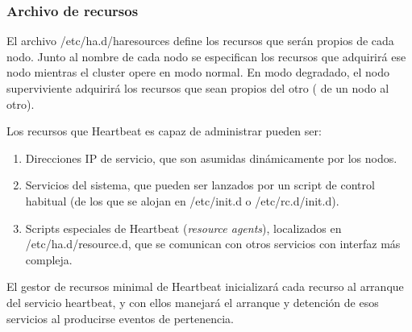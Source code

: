 




\subsubsection{Archivo de recursos}
El archivo /etc/ha.d/haresources define los recursos que serán propios de cada nodo. Junto al nombre de cada nodo se especifican los recursos que adquirirá ese nodo mientras el cluster opere en modo normal. En modo degradado, el nodo superviviente adquirirá los recursos que sean propios del otro ( de un nodo al otro). 

Los recursos que Heartbeat es capaz de administrar pueden ser:


\begin{enumerate}
	\item Direcciones IP de servicio, que son asumidas dinámicamente por los nodos.
	\item Servicios del sistema, que pueden ser lanzados por un script de control habitual (de los que se alojan en /etc/init.d o /etc/rc.d/init.d).
	\item Scripts especiales de Heartbeat (\textit{resource agents}), localizados en /etc/ha.d/resource.d, que se comunican con otros servicios con interfaz más compleja.
\end{enumerate}

El gestor de recursos minimal de Heartbeat inicializará cada recurso al arranque del servicio heartbeat, y con ellos manejará el arranque y detención de esos servicios al producirse eventos de pertenencia.
\\
\newline
{}


